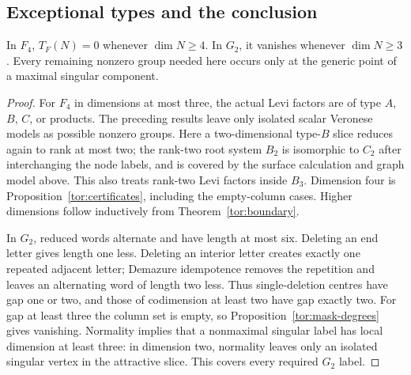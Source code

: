 \subsection{Exceptional types and the conclusion}
\begin{proposition}\label{tor:exceptional}
In $F_4$, $T_F(N)=0$ whenever $\dim N\ge4$. In $G_2$, it vanishes whenever $\dim N\ge3$. Every remaining nonzero group needed here occurs only at the generic point of a maximal singular component.
\end{proposition}
\begin{proof}
For $F_4$ in dimensions at most three, the actual Levi factors are of type $A$, $B$, $C$, or products. The preceding results leave only isolated scalar Veronese models as possible nonzero groups. Here a two-dimensional type-$B$ slice reduces again to rank at most two; the rank-two root system $B_2$ is isomorphic to $C_2$ after interchanging the node labels, and is covered by the surface calculation and graph model above. This also treats rank-two Levi factors inside $B_3$. Dimension four is Proposition~\ref{tor:certificates}, including the empty-column cases. Higher dimensions follow inductively from Theorem~\ref{tor:boundary}.

In $G_2$, reduced words alternate and have length at most six. Deleting an end letter gives length one less. Deleting an interior letter creates exactly one repeated adjacent letter; Demazure idempotence removes the repetition and leaves an alternating word of length two less. Thus single-deletion centres have gap one or two, and those of codimension at least two have gap exactly two. For gap at least three the column set is empty, so Proposition~\ref{tor:mask-degrees} gives vanishing. Normality implies that a nonmaximal singular label has local dimension at least three: in dimension two, normality leaves only an isolated singular vertex in the attractive slice. This covers every required $G_2$ label.
\end{proof}


